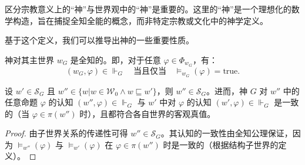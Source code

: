 \begin{remark}
    区分宗教意义上的“神”与\wkn 世界观中的“神”是重要的。这里的“神”是一个理想化的数学构造，旨在捕捉全知全能的概念，而非特定宗教或文化中的神学定义。
\end{remark}

基于这个定义，我们可以推导出神的一些重要性质。

\begin{theorem}[神对主世界的全知]
    神对其主世界 \( w_G \) 是全知的。即，对于任意 \( \varphi \in \Phi_{w_G} \)，有：
    \begin{equation}
        (w_G, \varphi) \in \Vdash_G \quad \text{当且仅当} \quad \models_{w_G} (\varphi) = \text{true}.
    \end{equation}
\end{theorem}

\begin{theorem}[神对局部信息的掌控]
    设 \( w' \in \mathcal{S}_G \) 且 \( w'' \in \{w | w \in \mathcal{W}_0 \land w \sqsubseteq w'\}\)，则 \( w'' \in \mathcal{S}_G \)。进而，神 \(G\) 对 \( w'' \) 中的任意命题 \( \varphi \) 的认知 \( (w'', \varphi) \in \Vdash_G \) 与 \( w' \) 中对 \( \varphi \) 的认知 \( (w', \varphi) \in \Vdash_G \) 是一致的（当 \( \varphi \in \pi(w'') \) 时），且都符合各自世界的客观真值。

\end{theorem}
\begin{proof}
    由子世界关系的传递性可得 \( w'' \in \mathcal{S}_G \)。其认知的一致性由全知公理保证，因为 \( \models_{w''}(\varphi) \) 与 \( \models_{w'}(\varphi) \) 在 \( \varphi \in \pi(w'') \) 时是一致的（根据结构子世界的定义）。
\end{proof}

